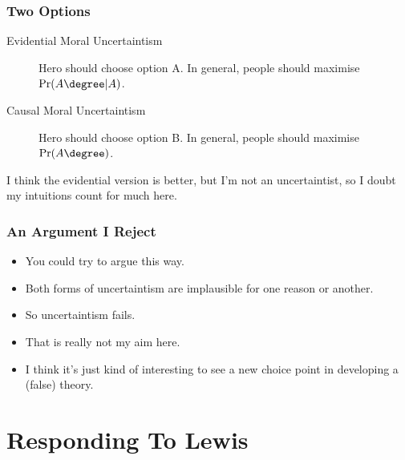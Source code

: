 \begin{frame}[fragile]
\frametitle{Two Options}
\label{twooptions}

\begin{description}
\item[Evidential Moral Uncertaintism]

Hero should choose option A. In general, people should maximise $\Pr(A\degree | A)$.

\item[Causal Moral Uncertaintism]

Hero should choose option B. In general, people should maximise $\Pr(A\degree)$. \pause 
\end{description}

I think the evidential version is better, but I'm not an uncertaintist, so I doubt my intuitions count for much here.

\end{frame}

\begin{frame}[fragile]
\frametitle{An Argument I Reject}
\label{anargumentireject}

\begin{itemize}
\item{} You could try to argue this way.

\item{} Both forms of uncertaintism are implausible for one reason or another.

\item{} So uncertaintism fails.

\item{} That is really not my aim here.

\item{} I think it's just kind of interesting to see a new choice point in developing a (false) theory.

\end{itemize}

\end{frame}

\section{Responding To Lewis}
\label{respondingtolewis}

